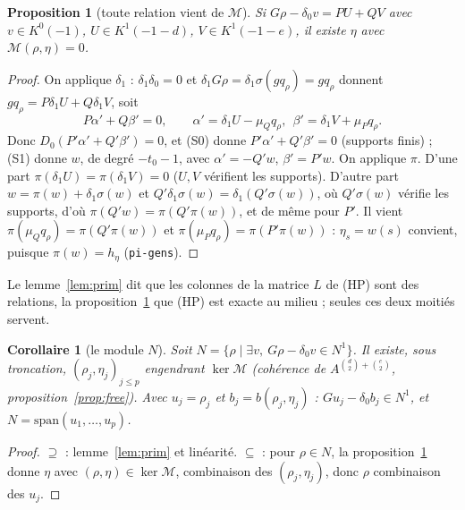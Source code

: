 \documentclass[11pt]{amsart}
\newtheorem{proposition}[theorem]{Proposition}
\newtheorem{corollary}[theorem]{Corollaire}
\theoremstyle{definition}
\theoremstyle{remark}
\newcommand{\sm}{\mathrm{span}}
\begin{document}
\begin{proposition}[toute relation vient de $\mathcal M$]\label{prop:rel}
Si $G\rho-\delta_0v=PU+QV$ avec $v\in K^0(-1)$, $U\in K^1(-1-d)$,
$V\in K^1(-1-e)$, il existe $\eta$ avec $\mathcal M(\rho,\eta)=0$.
\end{proposition}

\begin{proof}
On applique $\delta_1$ : $\delta_1\delta_0=0$ et
$\delta_1G\rho=\delta_1\sigma(gq_\rho)=gq_\rho$ donnent
$gq_\rho=P\delta_1U+Q\delta_1V$, soit
\[P\alpha'+Q\beta'=0,\qquad \alpha'=\delta_1U-\mu_Qq_\rho,\ \ \beta'=\delta_1V+\mu_Pq_\rho .\]
Donc $D_0(P'\alpha'+Q'\beta')=0$, et (S0) donne $P'\alpha'+Q'\beta'=0$
(supports finis) ; (S1) donne $w$, de degré $-t_0-1$, avec
$\alpha'=-Q'w$, $\beta'=P'w$. On applique $\pi$. D'une part
$\pi(\delta_1U)=\pi(\delta_1V)=0$ ($U,V$ vérifient les supports). D'autre
part $w=\pi(w)+\delta_1\sigma(w)$ et $Q'\delta_1\sigma(w)=\delta_1(Q'\sigma(w))$,
où $Q'\sigma(w)$ vérifie les supports, d'où $\pi(Q'w)=\pi(Q'\pi(w))$, et
de même pour $P'$. Il vient
$\pi(\mu_Qq_\rho)=\pi(Q'\pi(w))$ et $\pi(\mu_Pq_\rho)=\pi(P'\pi(w))$ :
$\eta_s=w(s)$ convient, puisque $\pi(w)=h_\eta$ (\texttt{pi-gens}).
\end{proof}

Le lemme~\ref{lem:prim} dit que les colonnes de la matrice $L$ de (HP)
sont des relations, la proposition~\ref{prop:rel} que (HP) est exacte au
milieu ; seules ces deux moitiés servent.

\begin{corollary}[le module $N$]\label{cor:N}
Soit $N=\{\rho\mid\exists v,\ G\rho-\delta_0v\in N^1\}$. Il existe, sous
troncation, $(\rho_j,\eta_j)_{j\le p}$ engendrant $\ker\mathcal M$ (cohérence
de $A^{\binom d2+\binom e2}$, proposition~\ref{prop:free}). Avec
$u_j=\rho_j$ et $b_j=b(\rho_j,\eta_j)$ :
$Gu_j-\delta_0b_j\in N^1$, et $N=\sm(u_1,\dots,u_p)$.
\end{corollary}

\begin{proof}
$\supseteq$ : lemme~\ref{lem:prim} et linéarité. $\subseteq$ : pour
$\rho\in N$, la proposition~\ref{prop:rel} donne $\eta$ avec
$(\rho,\eta)\in\ker\mathcal M$, combinaison des $(\rho_j,\eta_j)$, donc
$\rho$ combinaison des $u_j$.
\end{proof}
\end{document}
